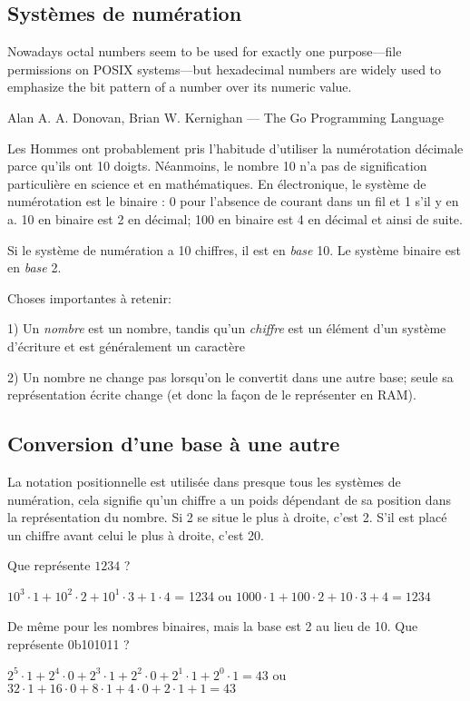 ﻿\subsection{Systèmes de numération}

\epigraph{Nowadays octal numbers seem to be
used for exactly one purpose---file permissions on POSIX systems---but hexadecimal numbers
are widely used to emphasize the bit pattern of a number over its numeric value.}
{Alan A. A. Donovan, Brian W. Kernighan ---  The Go Programming Language}

Les Hommes ont probablement pris l'habitude d'utiliser la numérotation décimale parce
qu'ils ont 10 doigts. Néanmoins, le nombre 10 n'a pas de signification particulière
en science et en mathématiques. En électronique, le système de numérotation est le
binaire : 0 pour l'absence de courant dans un fil et 1 s'il y en a. 10 en binaire
est 2 en décimal; 100 en binaire est 4 en décimal et ainsi de suite.

Si le système de numération a 10 chiffres, il est en \emph{base} 10. %
Le système binaire est en \emph{base} 2.

Choses importantes à retenir:

1) Un \emph{nombre} est un nombre, tandis qu'un \emph{chiffre} est
un élément d'un système d'écriture et est généralement un caractère

2) Un nombre ne change pas lorsqu'on le convertit dans une autre base; seule sa
représentation écrite change (et donc la façon de le représenter en \ac{RAM}).

\subsection{Conversion d'une base à une autre}

La notation positionnelle est utilisée dans presque tous les systèmes de numération,
cela signifie qu'un chiffre a un poids dépendant de sa position dans la représentation
du nombre. Si 2 se situe le plus à droite, c'est 2. S'il est placé un chiffre avant
celui le plus à droite, c'est 20.

Que représente $1234$ ?

$10^3 \cdot 1 + 10^2 \cdot 2 + 10^1 \cdot 3 + 1 \cdot 4$ = 1234 ou $1000 \cdot 1 +
100 \cdot 2 + 10 \cdot 3 + 4 = 1234$

De même pour les nombres binaires, mais la base est 2 au lieu de 10. Que représente
0b101011 ?

$2^5 \cdot 1 + 2^4 \cdot 0 + 2^3 \cdot 1 + 2^2 \cdot 0 + 2^1 \cdot 1 + 2^0 \cdot 1 =
43$ ou $32 \cdot 1 + 16 \cdot 0 + 8 \cdot 1 + 4 \cdot 0 + 2 \cdot 1 + 1 = 43$


